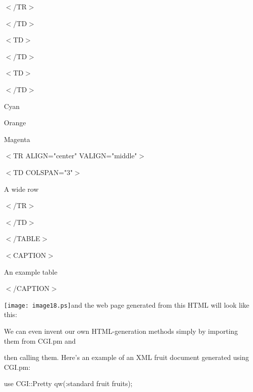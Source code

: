 \documentclass[a4paper,11pt]{book}
\begin{document}
\noindent 

\noindent 

\noindent $<$/TR$>$

\noindent 

\noindent $<$/TD$>$

\noindent $<$TD$>$

\noindent 

\noindent $<$/TD$>$

\noindent $<$TD$>$

\noindent 

\noindent $<$/TD$>$

\noindent Cyan

\noindent 

\noindent 

\noindent Orange

\noindent 

\noindent 

\noindent Magenta

\noindent $<$TR ALIGN="center" VALIGN="middle"$>$

\noindent $<$TD COLSPAN="3"$>$

\noindent A wide row

\noindent 

\noindent $<$/TR$>$

\noindent $<$/TD$>$

\noindent 

\noindent 

\noindent 

\noindent $<$/TABLE$>$

\noindent $<$CAPTION$>$

\noindent An example table

\noindent $<$/CAPTION$>$

\noindent 

\noindent \texttt{[image: image18.ps]}and the web page generated from this HTML will look like this:

\noindent 

\noindent 

\noindent 

\noindent We can even invent our own HTML-generation methods simply by importing them from CGI.pm and

\noindent then calling them. Here's an example of an XML fruit document generated using CGI.pm:

\noindent 

\noindent use CGI::Pretty qw(:standard fruit fruits);
\end{document}
